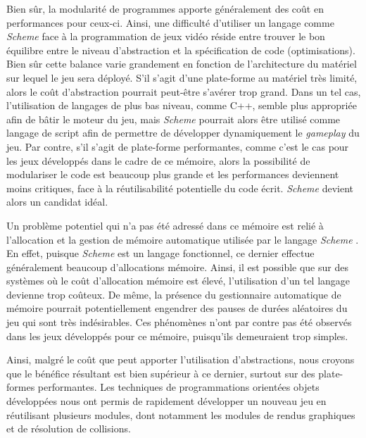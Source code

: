 \documentclass[12pt,twoside,letterpaper,francais]{book}
\newcommand{\Schemelang}{{\textit{Scheme }}}
\begin{document}
Bien sûr, la modularité de programmes apporte généralement des coût en
performances pour ceux-ci. Ainsi, une difficulté d'utiliser un langage
comme \Schemelang face à la programmation de jeux vidéo réside entre
trouver le bon équilibre entre le niveau d'abstraction et la
spécification de code (optimisations). Bien sûr cette balance varie
grandement en fonction de l'architecture du matériel sur lequel le jeu
sera déployé. S'il s'agit d'une plate-forme au matériel très limité,
alors le coût d'abstraction pourrait peut-être s'avérer trop
grand. Dans un tel cas, l'utilisation de langages de plus bas niveau,
comme C++, semble plus appropriée afin de bâtir le moteur du jeu, mais
\Schemelang pourrait alors être utilisé comme langage de script afin de
permettre de développer dynamiquement le \textit{gameplay} du jeu. Par
contre, s'il s'agit de plate-forme performantes, comme c'est le cas
pour les jeux développés dans le cadre de ce mémoire, alors la
possibilité de modulariser le code est beaucoup plus grande et les
performances deviennent moins critiques, face à la réutilisabilité
potentielle du code écrit. \Schemelang devient alors un candidat idéal.

Un problème potentiel qui n'a pas été adressé dans ce mémoire est
relié à l'allocation et la gestion de mémoire automatique utilisée par
le langage \Schemelang. En effet, puisque \Schemelang est un langage
fonctionnel, ce dernier effectue généralement beaucoup d'allocations
mémoire. Ainsi, il est possible que sur des systèmes où le coût
d'allocation mémoire est élevé, l'utilisation d'un tel langage
devienne trop coûteux. De même, la présence du gestionnaire
automatique de mémoire pourrait potentiellement engendrer des pauses
de durées aléatoires du jeu qui sont très indésirables. Ces phénomènes
n'ont par contre pas été observés dans les jeux développés pour ce
mémoire, puisqu'ils demeuraient trop simples.

Ainsi, malgré le coût que peut apporter l'utilisation d'abstractions,
nous croyons que le bénéfice résultant est bien supérieur à ce
dernier, surtout sur des plate-formes performantes. Les techniques de
programmations orientées objets développées nous ont permis de
rapidement développer un nouveau jeu en réutilisant plusieurs
modules, dont notamment les modules de rendus graphiques et de
résolution de collisions.




\end{document}
